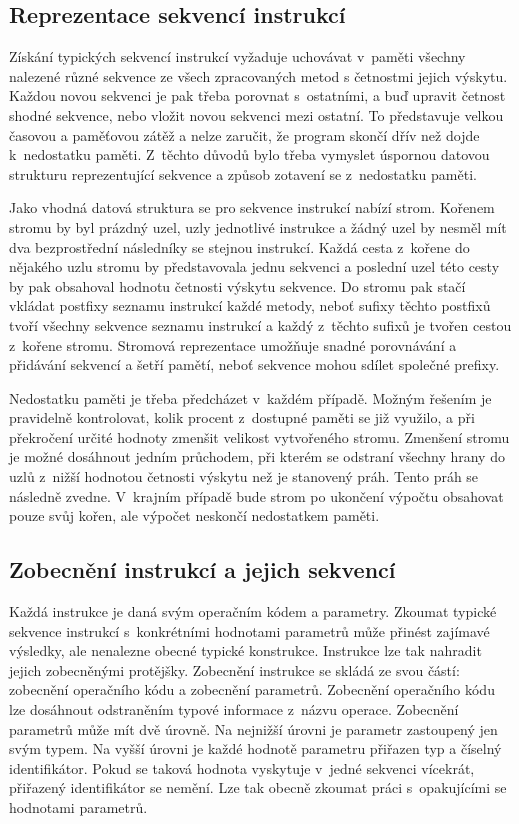 \subsection{Reprezentace sekvencí instrukcí}

Získání typických sekvencí instrukcí vyžaduje uchovávat v~paměti všechny nalezené různé sekvence ze všech zpracovaných metod s četnostmi jejich výskytu. Každou novou sekvenci je pak třeba porovnat s~ostatními, a buď upravit četnost shodné sekvence, nebo vložit novou sekvenci mezi ostatní. To představuje velkou časovou a paměťovou zátěž a nelze zaručit, že program skončí dřív než dojde k~nedostatku paměti. Z~těchto důvodů bylo třeba vymyslet úspornou datovou strukturu reprezentující sekvence a způsob zotavení se z~nedostatku paměti.

Jako vhodná datová struktura se pro sekvence instrukcí nabízí strom. Kořenem stromu by byl prázdný uzel, uzly jednotlivé instrukce a žádný uzel by nesměl mít dva bezprostřední následníky se stejnou instrukcí. Každá cesta z~kořene do nějakého uzlu stromu by představovala jednu sekvenci a poslední uzel této cesty by pak obsahoval hodnotu četnosti výskytu sekvence. Do stromu pak stačí vkládat postfixy seznamu instrukcí každé metody, neboť sufixy těchto postfixů tvoří všechny sekvence seznamu instrukcí a každý z~těchto sufixů je tvořen cestou z~kořene stromu. Stromová reprezentace umožňuje snadné porovnávání a přidávání sekvencí a šetří pamětí, neboť sekvence mohou sdílet společné prefixy.

Nedostatku paměti je třeba předcházet v~každém případě. Možným řešením je pravidelně kontrolovat, kolik procent z~dostupné paměti se již využilo, a při překročení určité hodnoty zmenšit velikost vytvořeného stromu. Zmenšení stromu je možné dosáhnout jedním průchodem, při kterém se odstraní všechny hrany do uzlů z~nižší hodnotou četnosti výskytu než je stanovený práh. Tento práh se následně zvedne. V~krajním případě bude strom po ukončení výpočtu obsahovat pouze svůj kořen, ale výpočet neskončí nedostatkem paměti.

\subsection{Zobecnění instrukcí a jejich sekvencí}

Každá instrukce je daná svým operačním kódem a parametry. Zkoumat typické sekvence instrukcí s~konkrétními hodnotami parametrů může přinést zajímavé výsledky, ale nenalezne obecné typické konstrukce. Instrukce lze tak nahradit jejich zobecněnými protějšky. Zobecnění instrukce se skládá ze svou částí: zobecnění operačního kódu a zobecnění parametrů. Zobecnění operačního kódu lze dosáhnout odstraněním typové informace z~názvu operace. Zobecnění parametrů může mít dvě úrovně. Na nejnižší úrovni je parametr zastoupený jen svým typem. Na vyšší úrovni je každé hodnotě parametru přiřazen typ a číselný identifikátor. Pokud se taková hodnota vyskytuje v~jedné sekvenci vícekrát, přiřazený identifikátor se nemění. Lze tak obecně zkoumat práci s~opakujícími se hodnotami parametrů.

